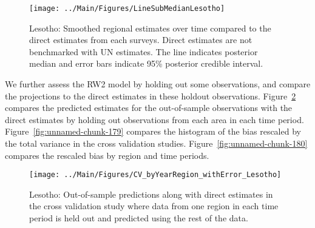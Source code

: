 \documentclass[12pt]{article}\usepackage[]{graphicx}\usepackage[]{color}
\newenvironment{knitrout}{}{} %
\begin{document}
\begin{knitrout}
\color{fgcolor}\begin{figure}[bht]

{\centering \texttt{[image: ../Main/Figures/LineSubMedianLesotho]} 

}

\caption[Lesotho]{Lesotho: Smoothed regional estimates over time compared to the direct estimates from each surveys. Direct estimates are not benchmarked with UN estimates. The line indicates posterior median and error bars indicate 95\% posterior credible interval.}\label{fig:unnamed-chunk-177}
\end{figure}


\end{knitrout}
We further assess the RW2 model by holding out some observations, and compare the projections to the direct estimates in these holdout observations. Figure~\ref{fig:unnamed-chunk-178} compares the predicted estimates for the out-of-sample observations  with the direct estimates by holding out observations from each area in each time period.  Figure~\ref{fig:unnamed-chunk-179} compares the histogram of the bias rescaled by the total variance in the cross validation studies. Figure~\ref{fig:unnamed-chunk-180} compares the rescaled bias by region and time periods.



 
\begin{knitrout}
\color{fgcolor}\begin{figure}[bht]

{\centering \texttt{[image: ../Main/Figures/CV\_byYearRegion\_withError\_Lesotho]} 

}

\caption[Lesotho]{Lesotho: Out-of-sample predictions along with direct estimates in the cross validation study where data from one region in each time period is held out and predicted using the rest of the data.}\label{fig:unnamed-chunk-178}
\end{figure}


\end{knitrout}
\end{document}
